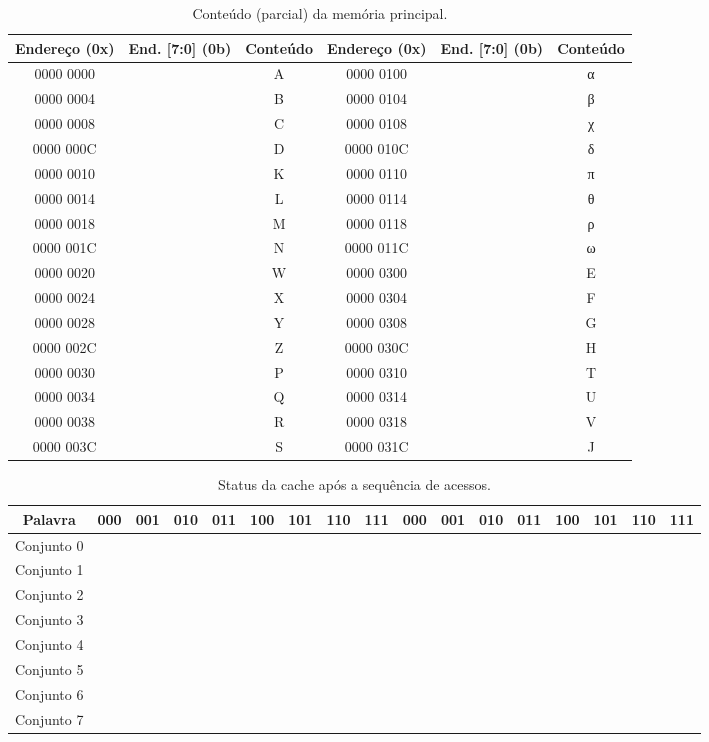 \documentclass{article}
\begin{document}
\begin{table}[ht!]
\centering
\begin{tabular}{|c|c|c|c|c|c|}
\hline Endereço (0x) & End. [7:0] (0b) & Conteúdo & Endereço (0x) & End. [7:0]
(0b) & Conteúdo \\
\hline 0000 0000 &  & A & 0000 0100 &  & \textgreek{α} \\
\hline 0000 0004 &  & B & 0000 0104 &  & \textgreek{β} \\
\hline 0000 0008 &  & C & 0000 0108 &  & \textgreek{χ} \\
\hline 0000 000C &  & D & 0000 010C &  & \textgreek{δ} \\
\hline 0000 0010 &  & K & 0000 0110 &  & \textgreek{π} \\
\hline 0000 0014 &  & L & 0000 0114 &  & \textgreek{θ} \\
\hline 0000 0018 &  & M & 0000 0118 &  & \textgreek{ρ} \\
\hline 0000 001C &  & N & 0000 011C &  & \textgreek{ω} \\
\hline 0000 0020 &  & W & 0000 0300 &  & E \\
\hline 0000 0024 &  & X & 0000 0304 &  & F \\
\hline 0000 0028 &  & Y & 0000 0308 &  & G \\
\hline 0000 002C &  & Z & 0000 030C &  & H \\
\hline 0000 0030 &  & P & 0000 0310 &  & T \\
\hline 0000 0034 &  & Q & 0000 0314 &  & U \\
\hline 0000 0038 &  & R & 0000 0318 &  & V \\
\hline 0000 003C &  & S & 0000 031C &  & J \\
\hline
\end{tabular}
\caption{Conteúdo (parcial) da memória principal.}
\end{table}

\begin{table}[ht!]
\centering
\begin{tabular}{|c|c|c|c|c|c|c|c|c|c|c|c|c|c|c|c|c|}
\hline Palavra & 000 & 001 & 010 & 011 & 100 & 101 & 110 & 111 & 000 & 001 &
010 & 011 & 100 & 101 & 110 & 111 \\
\hline Conjunto 0 &  &  &  &  &  &  &  &  &  &  &  &  &  &  &  &  \\
\hline Conjunto 1 &  &  &  &  &  &  &  &  &  &  &  &  &  &  &  &  \\
\hline Conjunto 2 &  &  &  &  &  &  &  &  &  &  &  &  &  &  &  &  \\
\hline Conjunto 3 &  &  &  &  &  &  &  &  &  &  &  &  &  &  &  &  \\
\hline Conjunto 4 &  &  &  &  &  &  &  &  &  &  &  &  &  &  &  &  \\
\hline Conjunto 5 &  &  &  &  &  &  &  &  &  &  &  &  &  &  &  &  \\
\hline Conjunto 6 &  &  &  &  &  &  &  &  &  &  &  &  &  &  &  &  \\
\hline Conjunto 7 &  &  &  &  &  &  &  &  &  &  &  &  &  &  &  &  \\
\hline
\end{tabular}
\caption{Status da cache após a sequência de acessos.}
\end{table}
\end{document}
